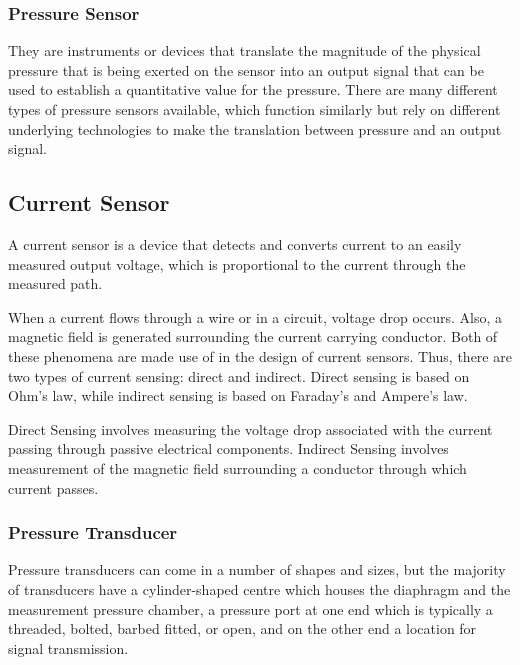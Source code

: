 \subsubsection{Pressure Sensor}
They are instruments or devices that translate the magnitude of the physical pressure that is being exerted on the sensor into an output signal that can be used to establish a quantitative value for the pressure. There are many different types of pressure sensors available, which function similarly but rely on different underlying technologies to make the translation between pressure and an output signal\cite{noauthor_types_nodate}.  

\subsection{Current Sensor}
A current sensor is a device that detects and converts current to an easily measured output voltage, which is proportional to the current through the measured path.

When a current flows through a wire or in a circuit, voltage drop occurs. Also, a magnetic field is generated surrounding the current carrying conductor. Both of these phenomena are made use of in the design of current sensors. Thus, there are two types of current sensing: direct and indirect. Direct sensing is based on Ohm’s law, while indirect sensing is based on Faraday’s and Ampere’s law.

Direct Sensing involves measuring the voltage drop associated with the current passing through passive electrical components.
Indirect Sensing involves measurement of the magnetic field surrounding a conductor through which current passes.
\subsubsection{Pressure Transducer}
Pressure transducers can come in a number of shapes and sizes, but the majority of transducers have a cylinder-shaped centre which houses the diaphragm and the measurement pressure chamber, a pressure port at one end which is typically a threaded, bolted, barbed fitted, or open, and on the other end a location for signal transmission\cite{noauthor_different_nodate}. 




